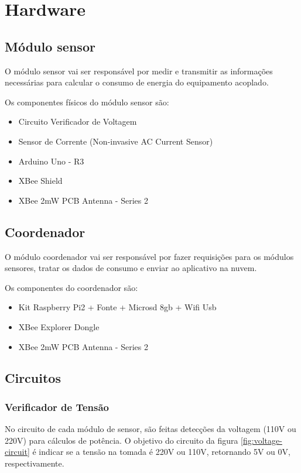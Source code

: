 \section{Hardware}
\label{Sec:hardware}
\subsection{Módulo sensor}

O módulo sensor vai ser responsável por medir e transmitir as informações necessárias para calcular o consumo de energia do equipamento acoplado.

Os componentes físicos do módulo sensor são:

\begin{itemize}
\item Circuito Verificador de Voltagem
\item Sensor de Corrente (Non-invasive AC Current Sensor)
\item Arduino Uno - R3
\item XBee Shield
\item XBee 2mW PCB Antenna - Series 2
\end{itemize}
%
\subsection{Coordenador}

O módulo coordenador vai ser responsável por fazer requisições para os módulos sensores, tratar os dados de consumo e enviar ao aplicativo na nuvem.

Os componentes do coordenador são:

\begin{itemize}
\item Kit Raspberry Pi2 + Fonte + Microsd 8gb + Wifi Usb
\item XBee Explorer Dongle
\item XBee 2mW PCB Antenna - Series 2
\end{itemize}
%
\subsection{Circuitos}
\subsubsection{Verificador de Tensão}

No circuito de cada módulo de sensor, são feitas detecções da voltagem (110V ou 220V) para cálculos de potência.  O objetivo do circuito da figura \ref{fig:voltage-circuit} é indicar se a tensão na tomada é 220V ou 110V, retornando 5V ou 0V, respectivamente.


